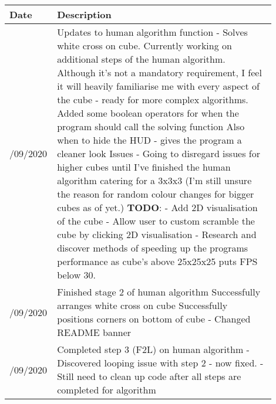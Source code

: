 \documentclass[10pt]{article} %
\begin{document}
\begin{table}[!ht]
    \centering
    \begin{tabular}{
        |>{\centering\arraybackslash}p{0.1\linewidth}
        |p{0.8\linewidth}|}
    \hline
    \textbf{Date} & \textbf{Description} \\ \hline
    12/09/2020  &
    Updates to human algorithm function - Solves white cross on cube.   \newline
    Currently working on additional steps of the human algorithm.
    \newline
    Although it's not a mandatory requirement, I feel it will heavily familiarise me with every aspect of the cube - ready for more complex algorithms.
    \newline
    Added some boolean operators for when the program should call the solving function
    \newline
    Also when to hide the HUD - gives the program a cleaner look
    \newline
    Issues\newline
    - Going to disregard issues for higher cubes until I've finished the human algorithm catering for a 3x3x3
    (I'm still unsure the reason for random colour changes for bigger cubes as of yet.)\newline
    \textbf{TODO}:\newline
    - Add 2D visualisation of the cube\newline
        - Allow user to custom scramble the cube by clicking 2D visualisation\newline
    - Research and discover methods of speeding up the programs performance as cube's above 25x25x25 puts FPS below 30.\newline
    \\ \hline
    13/09/2020  &   
    Finished stage 2 of human algorithm \newline
    Successfully arranges white cross on cube   \newline
    Successfully positions corners on bottom of cube    \newline
    - Changed README banner
    \\ \hline
    15/09/2020  &
    Completed step 3 (F2L) on human algorithm   \newline
    - Discovered looping issue with step 2 - now fixed. \newline
    - Still need to clean up code after all steps are completed for algorithm   \newline

\end{tabular}
\end{table}
\end{document}
